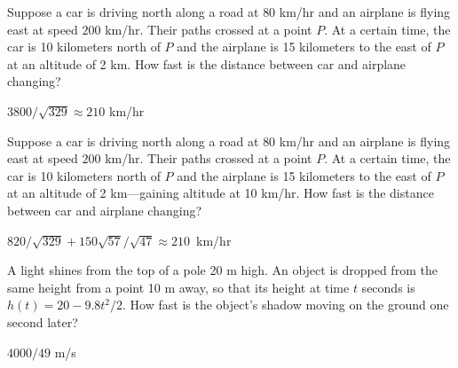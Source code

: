 \begin{exercises}
\begin{exercise} 
Suppose a car is driving north along a road at $80$ km/hr and an
airplane is flying east at speed $200$ km/hr. Their paths crossed at a
point $P$. At a certain time, the car is 10 kilometers north of $P$
and the airplane is 15 kilometers to the east of $P$ at an altitude of
2 km. How fast is the distance between car and airplane changing?
\begin{answer} $3800/\sqrt{329}\approx 210$ km/hr 
\end{answer}\end{exercise}




\begin{exercise} 
Suppose a car is driving north along a road at $80$ km/hr and an
airplane is flying east at speed $200$ km/hr. Their paths crossed at a
point $P$. At a certain time, the car is 10 kilometers north of $P$
and the airplane is 15 kilometers to the east of $P$ at an altitude of
2 km---gaining altitude at 10 km/hr. How fast is the distance between
car and airplane changing?
\begin{answer} \hbox{$820/\sqrt{329}+150\sqrt{57}/\sqrt{47}\approx 210$ km/hr}
\end{answer}\end{exercise}

\begin{exercise}
A light shines from the top of a pole 20 m high.  An object is dropped from
the same height from a point 10 m away, so that its height at time $t$
seconds is $h(t)=20-9.8t^2/2$.  How fast is the object's shadow
moving on the ground one second later?
\begin{answer} $4000/49$ m/s
\end{answer}\end{exercise}


\end{exercises}
